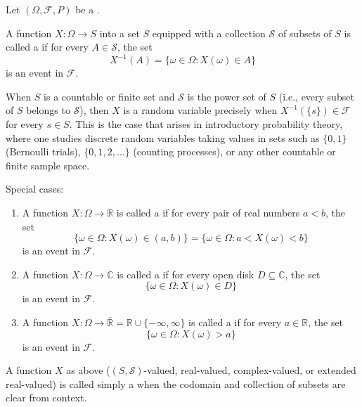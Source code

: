 \begin{definition} \label{definition:random_variable_on_a_probability_space}
Let $(\Omega, \mathcal{F}, P)$ be a .

A function $X : \Omega \to S$ into a set $S$ equipped with a collection $\mathcal{S}$ of subsets of $S$ is called a  if for every $A \in \mathcal{S}$, the set
$$X^{-1}(A) = \{\omega \in \Omega : X(\omega) \in A\}$$
is an event in $\mathcal{F}$.

When $S$ is a countable or finite set and $\mathcal{S}$ is the power set of $S$ (i.e., every subset of $S$ belongs to $\mathcal{S}$), then $X$ is a random variable precisely when $X^{-1}(\{s\}) \in \mathcal{F}$ for every $s \in S$. This is the case that arises in introductory probability theory, where one studies discrete random variables taking values in sets such as $\{0, 1\}$ (Bernoulli trials), $\{0, 1, 2, \dots\}$ (counting processes), or any other countable or finite sample space.

Special cases:
\begin{enumerate}
    \item A function $X : \Omega \to \mathbb{R}$ is called a  if for every pair of real numbers $a < b$, the set
    $$\{\omega \in \Omega : X(\omega) \in (a, b)\} = \{\omega \in \Omega : a < X(\omega) < b\}$$
    is an event in $\mathcal{F}$.

    \item A function $X : \Omega \to \mathbb{C}$ is called a  if for every open disk $D \subseteq \mathbb{C}$, the set
    $$\{\omega \in \Omega : X(\omega) \in D\}$$
    is an event in $\mathcal{F}$.

    \item A function $X : \Omega \to \overline{\mathbb{R}} = \mathbb{R} \cup \{-\infty, \infty\}$ is called a  if for every $a \in \mathbb{R}$, the set
    $$\{\omega \in \Omega : X(\omega) > a\}$$
    is an event in $\mathcal{F}$.
\end{enumerate}

A function $X$ as above ($(S, \mathcal{S})$-valued, real-valued, complex-valued, or extended real-valued) is called simply a  when the codomain and collection of subsets are clear from context.
\end{definition}
